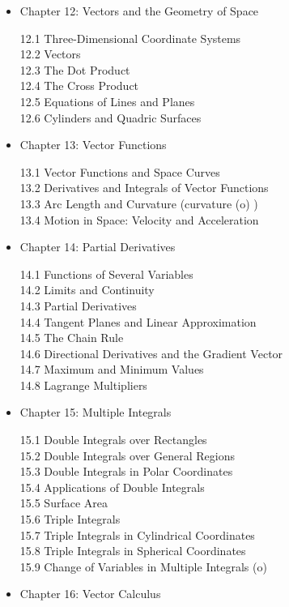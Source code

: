 \documentclass[12 pt]{article}
\begin{document}
		
		\begin{itemize}
		
		
		\item[]Chapter 12: Vectors and the Geometry of Space 
		
12.1 Three-Dimensional Coordinate Systems\\
12.2 Vectors \\
12.3 The Dot Product\\ 
12.4 The Cross Product \\
12.5 Equations of Lines and Planes \\
12.6 Cylinders and Quadric Surfaces 
\item[]Chapter 13: Vector Functions

13.1 Vector Functions and Space Curves\\ 
13.2 Derivatives and Integrals of Vector Functions\\ 
13.3 Arc Length and Curvature (curvature (o) )\\ 
13.4 Motion in Space: Velocity and Acceleration
\item[]Chapter 14: Partial Derivatives

14.1 Functions of Several Variables\\ 
14.2 Limits and Continuity\\ 
14.3 Partial Derivatives\\ 
14.4 Tangent Planes and Linear Approximation\\ 
14.5 The Chain Rule\\ 
14.6 Directional Derivatives and the Gradient Vector\\ 
14.7 Maximum and Minimum Values\\ 
14.8 Lagrange Multipliers
\item[]Chapter 15: Multiple Integrals

15.1 Double Integrals over Rectangles\\ 
15.2 Double Integrals over General Regions\\ 
15.3 Double Integrals in Polar Coordinates\\ 
15.4 Applications of Double Integrals\\ 
15.5 Surface Area\\ 
15.6 Triple Integrals\\ 
15.7 Triple Integrals in Cylindrical Coordinates\\ 
15.8 Triple Integrals in Spherical Coordinates\\ 
15.9 Change of Variables in Multiple Integrals (o)
\item[]Chapter 16: Vector Calculus


\end{itemize}
\end{document}
